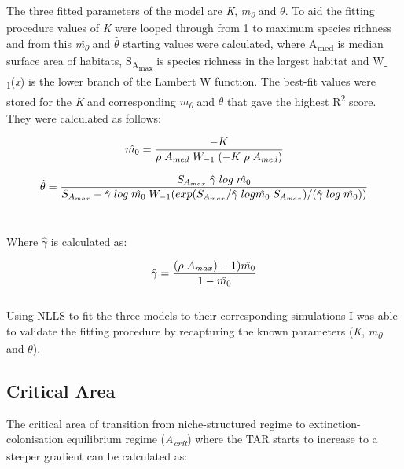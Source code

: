 {\texorpdfstring

\noindent \noindent  The three fitted parameters of the model are \textit{K}, \textit{m\textsubscript{0}} and $\theta$. To aid the fitting procedure values of \textit{K} were looped through from 1 to maximum species richness and from this \textit{\^{m\textsubscript{0}}} and $\hat{\theta}$ starting values were calculated, where A\textsubscript{med} is median surface area of habitats, S\textsubscript{A\textsubscript{max}} is species richness in the largest habitat and W\textsubscript{-1}(\textit{x}) is the lower branch of the Lambert W function. The best-fit values were stored for the \textit{K} and corresponding \textit{m\textsubscript{0}} and ${\theta}$ that gave the highest R\textsuperscript{2} score. They were calculated as follows:

\begin{equation}
\hat{m\textsubscript{0}}=\frac{-K}{{\rho}\;A_{med}\;W_{-1}\;(-K\;{\rho}\;A_{med})}
\end{equation}

\begin{equation}
\hat{\theta}=\frac{S_{A_{max}}\;\hat{\gamma}\;log\;\hat{m\textsubscript{0}}}{S_{A_{max}}-\hat{\gamma}\;log\;\hat{m\textsubscript{0}}\;W_{-1}(exp(S_{A_{max}}/\hat{\gamma}\;log\hat{m\textsubscript{0}}\;S_{A_{max}})/(\hat{\gamma}\;log\;\hat{m\textsubscript{0}}))}
\end{equation} \\

\begin{center}
Where $\hat{\gamma}$ is calculated as:\\
\end{center}

\begin{equation}
\hat{\gamma}=\frac{({\rho}\;A_{max})-1)\hat{m\textsubscript{0}}}{1-\hat{m\textsubscript{0}}}
\end{equation}\\

\noindent Using NLLS to fit the three models to their corresponding simulations I was able to validate the fitting procedure by recapturing the known parameters (\textit{K}, \textit{m\textsubscript{0}} and $\theta$).


\subsection{Critical Area}


\noindent The critical area of transition from niche-structured regime to extinction-colonisation equilibrium regime (\textit{A\textsubscript{crit}}) where the TAR starts to increase to a steeper gradient can be calculated as:

}
